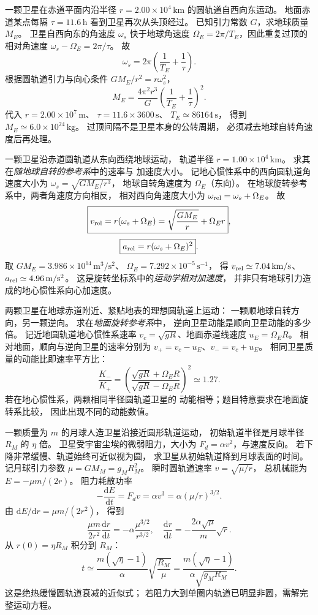 一颗卫星在赤道平面内沿半径
$r=2.00\times10^4\,\mathrm{km}$ 的圆轨道自西向东运动。
地面赤道某点每隔 $\tau=11.6\,\mathrm h$
看到卫星再次从头顶经过。
已知引力常数 $G$，求地球质量 $M_E$。
\exsolution
卫星自西向东的角速度 $\omega_s$ 快于地球角速度
$\Omega_E=2\pi/T_E$，因此重复过顶的相对角速度
$\omega_s-\Omega_E=2\pi/\tau$。
故
\[
\omega_s=2\pi\left(\frac1{T_E}+\frac1\tau\right).
\]
根据圆轨道引力与向心条件
$GM_E/r^2=r\omega_s^2$，
\[
\boxed{M_E=\frac{4\pi^2r^3}{G}
\left(\frac1{T_E}+\frac1\tau\right)^2}.
\]
代入 $r=2.00\times10^7\,\mathrm m$、
$\tau=11.6\times3600\,\mathrm s$、
$T_E\simeq86164\,\mathrm s$，
得到 $\boxed{M_E\simeq6.0\times10^{24}\,\mathrm{kg}}$。
\excheck 过顶间隔不是卫星本身的公转周期，
必须减去地球自转角速度后再处理。

一颗卫星沿赤道圆轨道从东向西绕地球运动，
轨道半径 $r=1.00\times10^4\,\mathrm{km}$。
求其在\emph{随地球自转的参考系}中的速率与
加速度大小。
\exsolution
记地心惯性系中的西向圆轨道角速度大小为
$\omega_s=\sqrt{GM_E/r^3}$，
地球自转角速度为 $\Omega_E$（东向）。
在地球旋转参考系中，两者角速度方向相反，
相对西向角速度大小为
$\omega_{\rm rel}=\omega_s+\Omega_E$。
故
\[
\boxed{v_{\rm rel}=r(\omega_s+\Omega_E)
=\sqrt{\frac{GM_E}{r}}+\Omega_Er},
\]
\[
\boxed{a_{\rm rel}=r(\omega_s+\Omega_E)^2}.
\]
取 $GM_E=3.986\times10^{14}\,\mathrm{m^3/s^2}$、
$\Omega_E=7.292\times10^{-5}\,\mathrm s^{-1}$，
得 $v_{\rm rel}\simeq7.04\,\mathrm{km/s}$、
$a_{\rm rel}\simeq4.96\,\mathrm{m/s^2}$。
\excheck 这是旋转坐标系中的\emph{运动学相对加速度}，
并非只有地球引力造成的地心惯性系向心加速度。

两颗卫星在地球赤道附近、紧贴地表的理想圆轨道上运动：
一颗顺地球自转方向，另一颗逆向。
求在\emph{地面旋转参考系}中，
逆向卫星动能是顺向卫星动能的多少倍。
\exsolution
记近地圆轨道地心惯性系速率
$v_c=\sqrt{gR}$、地面赤道线速度
$u_E=\Omega_E R$。
相对地面，顺向与逆向卫星的速率分别为
$v_+=v_c-u_E$、$v_-=v_c+u_E$。
相同卫星质量的动能比即速率平方比：
\[
\boxed{\frac{K_-}{K_+}
=\left(\frac{\sqrt{gR}+\Omega_E R}
{\sqrt{gR}-\Omega_E R}\right)^2
\simeq1.27}.
\]
\excheck 若在地心惯性系，两颗相同半径圆轨道卫星的
动能相等；题目特意要求在地面旋转系比较，
因此出现不同的动能数值。

一颗质量为 $m$ 的月球人造卫星沿接近圆形轨道运动，
初始轨道半径是月球半径 $R_M$ 的 $\eta$ 倍。
卫星受宇宙尘埃的微弱阻力，大小为
$F_d=\alpha v^2$，与速度反向。
若下降非常缓慢、轨道始终可近似视为圆，
求卫星从初始轨道降到月球表面的时间。
\exsolution
记月球引力参数 $\mu=GM_M=g_MR_M^2$。
瞬时圆轨道速率 $v=\sqrt{\mu/r}$，
总机械能为 $E=-\mu m/(2r)$。
阻力耗散功率
\[
-\frac{\mathrm dE}{\mathrm dt}
=F_dv=\alpha v^3=\alpha(\mu/r)^{3/2}.
\]
由 $\mathrm dE/\mathrm dr=\mu m/(2r^2)$，
得到
\[
\frac{\mu m}{2r^2}\frac{\mathrm dr}{\mathrm dt}
=-\alpha\frac{\mu^{3/2}}{r^{3/2}},
\quad
\frac{\mathrm dr}{\mathrm dt}
=-\frac{2\alpha\sqrt\mu}{m}\sqrt r.
\]
从 $r(0)=\eta R_M$ 积分到 $R_M$：
\[
\boxed{t\simeq
\frac{m(\sqrt\eta-1)}{\alpha}
\sqrt{\frac{R_M}{\mu}}
=\frac{m(\sqrt\eta-1)}{\alpha\sqrt{g_MR_M}}}.
\]
\excheck 这是绝热缓慢圆轨道衰减的近似式；
若阻力大到单圈内轨道已明显非圆，需解完整运动方程。

